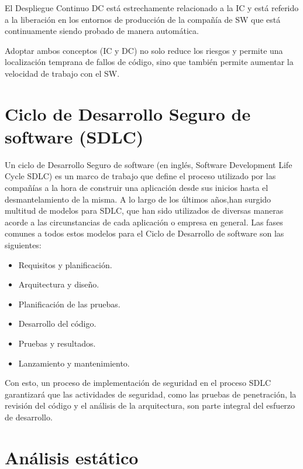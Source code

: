 El Despliegue Continuo \gls{DC} está estrechamente relacionado a la \gls{IC} y está referido a la liberación en los entornos de producción de la compañía de \gls{SW} que está continuamente siendo probado de manera automática.

Adoptar ambos conceptos (\gls{IC} y \gls{DC}) no solo reduce los riesgos y permite una localización temprana de fallos de código, sino que también permite aumentar la velocidad de trabajo con el \gls{SW}\cite{IC2017}.

\section{Ciclo de Desarrollo Seguro de software (\gls{SDLC})}

Un ciclo de Desarrollo Seguro de software (en inglés, Software Development Life Cycle \gls{SDLC}) es un marco de trabajo que define el proceso utilizado por las compañías a la hora de construir una aplicación desde sus inicios hasta el desmantelamiento de la misma. A lo largo de los últimos años,han surgido multitud de modelos para \gls{SDLC}, que han sido utilizados de diversas maneras acorde a las circunstancias de cada aplicación o empresa en general. Las fases comunes a todos estos modelos para el Ciclo de Desarrollo de software son las siguientes:

\begin{itemize}
	\item Requisitos y planificación.
	\item Arquitectura y diseño.
	\item Planificación de las pruebas.
	\item Desarrollo del código.
	\item Pruebas y resultados.
	\item Lanzamiento y mantenimiento.
\end{itemize}

Con esto, un proceso de implementación de seguridad en el proceso \gls{SDLC} garantizará que las actividades de seguridad, como las pruebas de penetración, la revisión del código y el análisis de la arquitectura, son parte integral del esfuerzo de desarrollo.

\section{Análisis estático}



